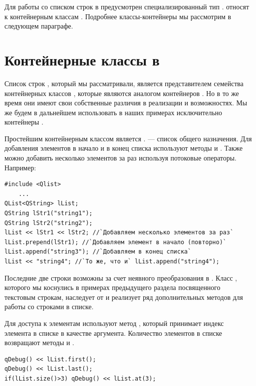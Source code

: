 Для работы со списком строк в  предусмотрен специализированный тип
.   относят к контейнерным классам .
Подробнее классы-контейнеры мы рассмотрим в следующем параграфе.

\section[Контейнерные классы в \Sys{Qt}]{Контейнерные классы в }

Список строк , который мы рассматривали, является представителем
семейства контейнерных классов , которые являются
аналогом контейнеров . Но в то же время они имеют свои собственные различия в 
реализации и возможностях. Мы же будем
в дальнейшем использовать в наших примерах исключительно контейнеры .

Простейшим контейнерным классом является . 
 --- список общего назначения. Для добавления элементов в начало и в конец списка используют методы
 и . Также можно добавить несколько элементов за раз
используя потоковые операторы. Например:
\begin{lstlisting}
#include <Qlist>
    ...
QList<QString> lList;
QString lStr1("string1");
QString lStr2("string2");
lList << lStr1 << lStr2; //`Добавляем несколько элементов за раз`
lList.prepend(lStr1); //`Добавляем элемент в начало (повторно)` 
lList.append("string3"); //`Добавляем в конец списка`
lList << "string4";	//`То же, что и` lList.append("string4");
\end{lstlisting}

Последние две строки возможны за счет неявного преобразования  в
. Класс , которого мы коснулись в примерах
предыдущего раздела посвященного текстовым строкам, наследует от 
и реализует ряд дополнительных методов для работы со строками в списке.

Для доступа к элементам используют метод , который принимает индекс элемента в
списке в качестве аргумента. Количество элементов в списке возвращают методы  и
.
\begin{lstlisting}
qDebug() << lList.first();
qDebug() << lList.last();
if(lList.size()>3) qDebug() << lList.at(3);
\end{lstlisting}

